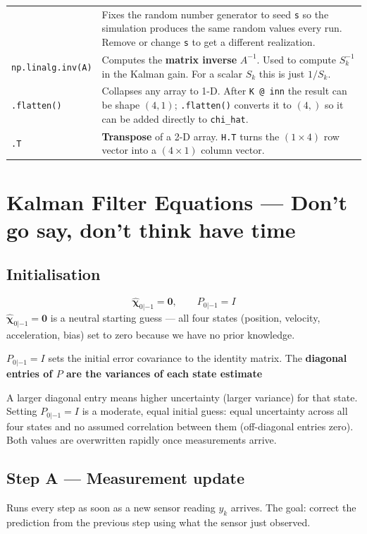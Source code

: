 \documentclass[12pt, a4paper]{article}
\begin{document}
\begin{center}
\begin{tabular}{p{4.5cm} p{9.0cm}}
    & Fixes the random number generator to seed \texttt{s} so
      the simulation produces the same random values every run.
      Remove or change \texttt{s} to get a different realization. \\
  \texttt{np.linalg.inv(A)}
    & Computes the \textbf{matrix inverse} $A^{-1}$.
      Used to compute $S_k^{-1}$ in the Kalman gain.
      For a scalar $S_k$ this is just $1/S_k$. \\
  \texttt{.flatten()}
    & Collapses any array to 1-D.
      After \texttt{K @ inn} the result can be shape $(4,1)$;
      \texttt{.flatten()} converts it to $(4,)$ so it can be
      added directly to \texttt{chi\_hat}. \\
  \texttt{.T}
    & \textbf{Transpose} of a 2-D array.
      \texttt{H.T} turns the $(1\times4)$ row vector into a
      $(4\times1)$ column vector. \\
  \bottomrule
\end{tabular}
\end{center}

\clearpage
\section*{Kalman Filter Equations --- Don't go say, don't think have time}
\vspace{-0.5cm}
\subsection*{Initialisation}
\vspace{-0.3cm}
\[
  \hat{\boldsymbol{\chi}}_{0|-1} = \mathbf{0}, \qquad P_{0|-1} = I
\]
$\hat{\boldsymbol{\chi}}_{0|-1} = \mathbf{0}$ is a neutral starting guess ---
all four states (position, velocity, acceleration, bias) set to zero
because we have no prior knowledge.

$P_{0|-1} = I$ sets the initial error covariance to the identity matrix.
The \textbf{diagonal entries of $P$ are the variances of each state estimate}

\begin{notebox}
  A larger diagonal entry means higher uncertainty (larger variance) for that state.
  Setting $P_{0|-1} = I$ is a moderate, equal initial guess:
  equal uncertainty across all four states and no assumed correlation between them
  (off-diagonal entries zero). Both values are overwritten rapidly once measurements arrive.
\end{notebox}

\subsection*{Step A --- Measurement update}
Runs every step as soon as a new sensor reading $y_k$ arrives.
The goal: correct the prediction from the previous step using
what the sensor just observed.
\end{document}
